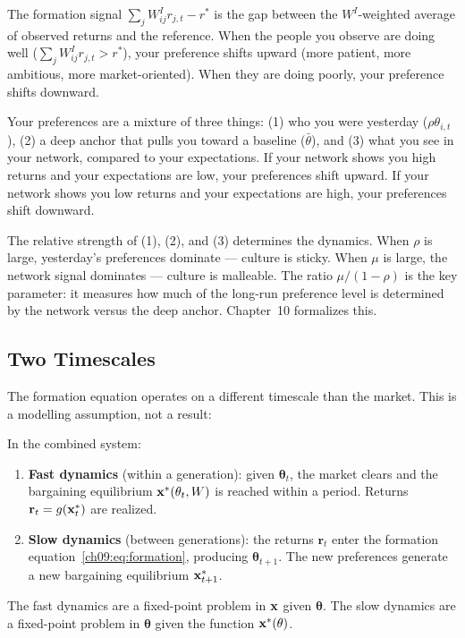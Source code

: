 \documentclass[../structural_economics_book.tex]{subfiles}
\begin{document}
The formation signal $\sum_j W^I_{ij} r_{j,t} - r^*$ is the gap between the $W^I$-weighted average of observed returns and the reference. When the people you observe are doing well ($\sum_j W^I_{ij} r_{j,t} > r^*$), your preference shifts upward (more patient, more ambitious, more market-oriented). When they are doing poorly, your preference shifts downward.

\begin{intuition}
Your preferences are a mixture of three things: (1) who you were yesterday ($\rho\theta_{i,t}$), (2) a deep anchor that pulls you toward a baseline ($\bar{\theta}$), and (3) what you see in your network, compared to your expectations. If your network shows you high returns and your expectations are low, your preferences shift upward. If your network shows you low returns and your expectations are high, your preferences shift downward.

The relative strength of (1), (2), and (3) determines the dynamics. When $\rho$ is large, yesterday's preferences dominate --- culture is sticky. When $\mu$ is large, the network signal dominates --- culture is malleable. The ratio $\mu / (1 - \rho)$ is the key parameter: it measures how much of the long-run preference level is determined by the network versus the deep anchor. Chapter~10 formalizes this.
\end{intuition}


\subsection{Two Timescales}

The formation equation operates on a different timescale than the market. This is a modelling assumption, not a result:

\begin{definition}\label{ch09:prop:timescales}
In the combined system:
\begin{enumerate}
\item \textbf{Fast dynamics} (within a generation): given $\boldsymbol{\theta}_t$, the market clears and the bargaining equilibrium $\mathbf{x}^*(\theta_t, W)$ is reached within a period. Returns $\mathbf{r}_t = g(\mathbf{x}^*_t)$ are realized.
\item \textbf{Slow dynamics} (between generations): the returns $\mathbf{r}_t$ enter the formation equation~\eqref{ch09:eq:formation}, producing $\boldsymbol{\theta}_{t+1}$. The new preferences generate a new bargaining equilibrium $\mathbf{x}^*_{t+1}$.
\end{enumerate}
The fast dynamics are a fixed-point problem in $\mathbf{x}$ given $\boldsymbol{\theta}$. The slow dynamics are a fixed-point problem in $\boldsymbol{\theta}$ given the function $\mathbf{x}^*(\theta)$.
\end{definition}
\end{document}
